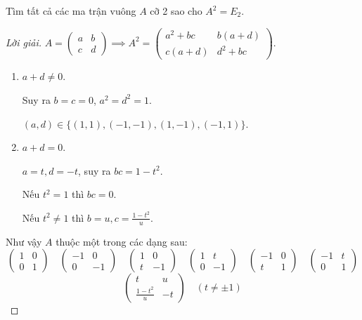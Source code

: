 \begin{exercise}
    Tìm tất cả các ma trận vuông $A$ cỡ 2 sao cho $A^{2} = E_{2}$.
\end{exercise}

\begin{proof}[Lời giải]
    $A = \begin{pmatrix}a & b \\ c & d\end{pmatrix}\implies A^{2} = \begin{pmatrix}a^{2}+bc & b(a+d) \\ c(a+d) & d^{2}+bc\end{pmatrix}$.
    \begin{enumerate}[label={Trường hợp \arabic*:},itemindent=2cm]
        \item $a + d\ne 0$.
              
              Suy ra $b = c = 0$, $a^{2} = d^{2} = 1$.
              
              $(a,d)\in\{  (1,1), (-1,-1), (1,-1), (-1,1) \}$.
        \item $a + d = 0$.
              
              $a = t, d = -t$, suy ra $bc = 1 - t^{2}$.
              
              Nếu $t^{2} = 1$ thì $bc = 0$.
              
              Nếu $t^{2} \ne 1$ thì $b = u, c = \frac{1-t^{2}}{u}$.
    \end{enumerate}
    
    Như vậy $A$ thuộc một trong các dạng sau:
    \[
        \begin{pmatrix}
            1 & 0 \\
            0 & 1
        \end{pmatrix}
        \quad
        \begin{pmatrix}
            -1 & 0  \\
            0  & -1
        \end{pmatrix}
        \quad
        \begin{pmatrix}
            1 & 0  \\
            t & -1
        \end{pmatrix}
        \quad
        \begin{pmatrix}
            1 & t  \\
            0 & -1
        \end{pmatrix}
        \quad
        \begin{pmatrix}
            -1 & 0 \\
            t  & 1
        \end{pmatrix}
        \quad
        \begin{pmatrix}
            -1 & t \\
            0  & 1
        \end{pmatrix}
    \]
    \[
        \begin{pmatrix}
            t                 & u  \\
            \frac{1-t^{2}}{u} & -t
        \end{pmatrix} \quad (t\ne\pm{1})
    \]
\end{proof}

